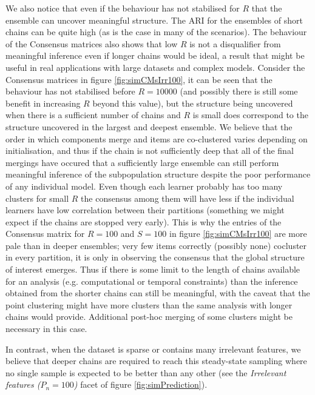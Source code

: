 \documentclass[]{article}
\begin{document}
We also notice that even if the behaviour has not stabilised for $R$ that the ensemble can uncover meaningful structure. The ARI for the ensembles of short chains can be quite high (as is the case in many of the scenarios). The behaviour of the Consensus matrices also shows that low $R$ is not a disqualifier from meaningful inference even if longer chains would be ideal, a result that might be useful in real applications with large datasets and complex models. Consider the Consensus matrices in figure \ref{fig:simCMsIrr100}, it can be seen that the behaviour has not stabilised before $R=10000$ (and possibly there is still some benefit in increasing $R$ beyond this value), but the structure being uncovered when there is a sufficient number of chains and $R$ is small does correspond to the structure uncovered in the largest and deepest ensemble. We believe that the order in which components merge and items are co-clustered varies depending on initialisation, and thus if the chain is not sufficiently deep that all of the final mergings have occured that a sufficiently large ensemble can still perform meaningful inference of the subpopulation structure despite the poor performance of any individual model. Even though each learner probably has too many clusters for small $R$ the consensus among them will have less if the individual learners have low correlation between their partitions (something we might expect if the chains are stopped very early). This is why the entries of the Consensus matrix for $R=100$ and $S=100$ in figure \ref{fig:simCMsIrr100} are more pale than in deeper ensembles; very few items correctly (possibly none) cocluster in every partition, it is only in observing the consensus that the global structure of interest emerges. Thus if there is some limit to the length of chains available for an analysis (e.g. computational or temporal constraints) than the inference obtained from the shorter chains can still be meaningful, with the caveat that the point clustering might have more clusters than the same analysis with longer chains would provide. Additional post-hoc merging of some clusters might be necessary in this case.

In contrast, when the dataset is sparse or contains many irrelevant features, we believe that deeper chains are required to reach this steady-state sampling where no single sample is expected to be better than any other (see the \emph{Irrelevant features ($P_n = 100$)} facet of figure \ref{fig:simPrediction}).
\end{document}
